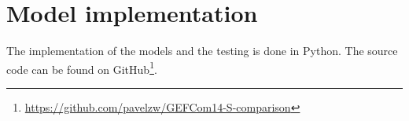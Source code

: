 \chapter{Model implementation}
\label{ch:model-implementation}

The implementation of the models and the testing is done in Python. 
The source code can be found on 
GitHub\footnote{\url{https://github.com/pavelzw/GEFCom14-S-comparison}}.









